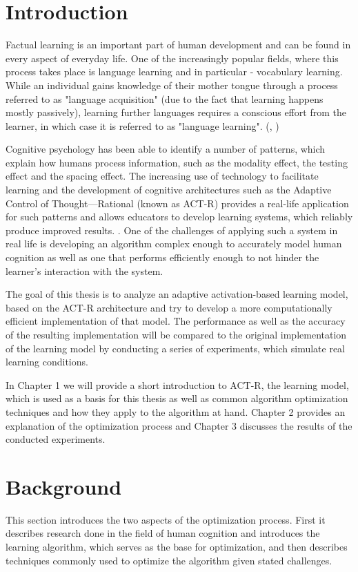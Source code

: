 \documentclass[a4paper]{report}
\begin{document}
\chapter{Introduction}
Factual learning is an important part of human development and can be found in every aspect of everyday life. One of the increasingly popular fields, where this process takes place is language learning and in particular - vocabulary learning. While an individual gains knowledge of their mother tongue through a process referred to as "language acquisition" (due to the fact that learning happens mostly passively), learning further languages requires a conscious effort from the learner, in which case it is referred to as "language learning". (\cite{clark09}, \cite{cooksingleton08})

Cognitive psychology has been able to identify a number of patterns, which explain how humans process information, such as the modality effect, the testing effect and the spacing effect. The increasing use of technology to facilitate learning and the development of cognitive architectures such as the Adaptive Control of Thought—Rational (known as ACT-R) provides a real-life application for such patterns and allows educators to develop learning systems, which reliably produce improved results. \citep{anderson18}. One of the challenges of applying such a system in real life is developing an algorithm complex enough to accurately model human cognition as well as one that performs efficiently enough to not hinder the learner's interaction with the system.

The goal of this thesis is to analyze an adaptive activation-based learning model, based on the ACT-R architecture and try to develop a more computationally efficient implementation of that model. The performance as well as the accuracy of the resulting implementation will be compared to the original implementation of the learning model by conducting a series of experiments, which simulate real learning conditions.

In Chapter 1 we will provide a short introduction to ACT-R, the learning model, which is used as a basis for this thesis as well as common algorithm optimization techniques and how they apply to the algorithm at hand. Chapter 2 provides an explanation of the optimization process and Chapter 3 discusses the results of the conducted experiments.


\chapter{Background}
This section introduces the two aspects of the optimization process. First it describes research done in the field of human cognition and introduces the learning algorithm, which serves as the base for optimization, and then describes techniques commonly used to optimize the algorithm given stated challenges.
\end{document}
